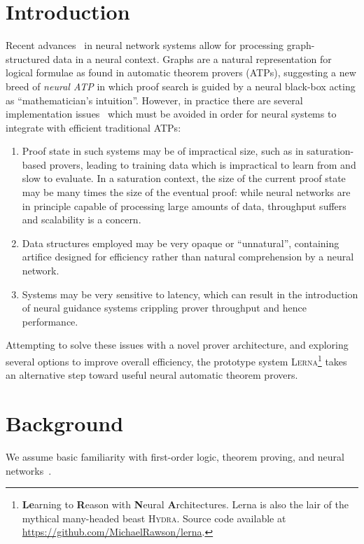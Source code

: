 \documentclass{llncs}
\newcommand{\lerna}{\textsc{Lerna}}
\begin{document}
\section{Introduction}
Recent advances~ in neural network systems allow for processing graph-structured data in a neural context.
Graphs are a natural representation for logical formulae as found in automatic theorem provers (ATPs), suggesting a new breed of \emph{neural ATP} in which proof search is guided by a neural black-box acting as ``mathematician's intuition''.
However, in practice there are several implementation issues~\cite{lerna-discussion} which must be avoided in order for neural systems to integrate with efficient traditional ATPs:
\begin{enumerate}
	\item Proof state in such systems may be of impractical size, such as in saturation-based provers, leading to training data which is impractical to learn from and slow to evaluate. In a saturation context, the size of the current proof state may be many times the size of the eventual proof: while neural networks are in principle capable of processing large amounts of data, throughput suffers and scalability is a concern.
	\item Data structures employed may be very opaque or ``unnatural'', containing artifice designed for efficiency rather than natural comprehension by a neural network.
	\item Systems may be very sensitive to latency, which can result in the introduction of neural guidance systems crippling prover throughput and hence performance.
\end{enumerate}
%
Attempting to solve these issues with a novel prover architecture, and exploring several options to improve overall efficiency, the prototype system \lerna{}\footnote{\textbf{Le}arning to \textbf{R}eason with \textbf{N}eural \textbf{A}rchitectures. Lerna is also the lair of the mythical many-headed beast \textsc{Hydra}. Source code available at \url{https://github.com/MichaelRawson/lerna}.} takes an alternative step toward useful neural automatic theorem provers.

\section{Background}

We assume basic familiarity with first-order logic, theorem proving, and  neural networks~\cite{neural-survey}.
\end{document}
